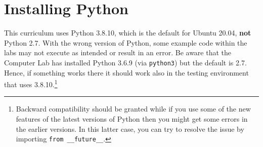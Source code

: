 \label{pythoninstall}

%
%
%
%
%
%
%


\section*{Installing Python}


\begin{warn}
This curriculum uses Python 3.8.10, which is the default for Ubuntu
20.04, \textbf{not} Python 2.7. With the wrong version of Python, some
example code within the labs may not execute as intended or result in an
error. Be aware that the Computer Lab has installed Python 3.6.9
(via \lstinline{python3}) but the default is 2.7. Hence, if something
works there it should work also in the testing environment that uses
3.8.10.\footnote{Backward compatibility should be granted while if you
use some of the new features of the latest versions of Python then you
might get some errors in the earlier versions. In this latter case, you
can try to resolve the issue by importing \lstinline{from __future__}.}
\end{warn}

